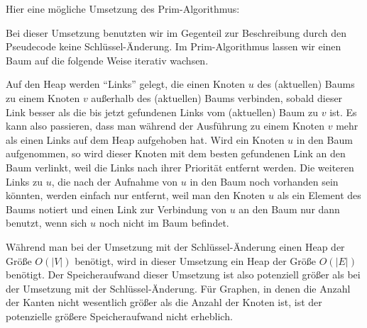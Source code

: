 \begin{bem} Hier eine mögliche Umsetzung des Prim-Algorithmus: 

Bei dieser Umsetzung benutzten wir im Gegenteil zur Beschreibung durch den Pseudecode keine Schlüssel-Änderung. Im Prim-Algorithmus lassen wir einen Baum auf die folgende Weise iterativ wachsen. 

Auf den Heap werden ``Links'' gelegt, die einen Knoten $u$ des (aktuellen) Baums zu einem Knoten $v$ außerhalb des (aktuellen) Baums verbinden, sobald dieser Link besser als die bis jetzt gefundenen Links vom (aktuellen) Baum zu $v$ ist. Es kann also passieren, dass man während der Ausführung zu einem Knoten $v$ mehr als einen Links auf dem Heap aufgehoben hat. Wird ein Knoten $u$ in den Baum aufgenommen, so wird dieser Knoten mit dem besten gefundenen Link an den Baum verlinkt, weil die Links nach ihrer Priorität entfernt werden. Die weiteren Links zu $u$, die nach der Aufnahme von $u$ in den Baum noch vorhanden sein könnten, werden einfach nur entfernt, weil man den Knoten $u$ als ein Element des Baums notiert und einen Link zur Verbindung von $u$ an den Baum nur dann benutzt, wenn sich $u$ noch nicht im Baum befindet.  

Während man bei der Umsetzung mit der Schlüssel-Änderung einen Heap der Größe $O(|V|)$ benötigt, wird in dieser Umsetzung ein Heap der Größe $O(|E|)$ benötigt. Der Speicheraufwand dieser Umsetzung ist also potenziell größer als bei der Umsetzung mit der Schlüssel-Änderung. Für Graphen, in denen die Anzahl der Kanten nicht wesentlich größer als die Anzahl der Knoten ist, ist der potenzielle größere Speicheraufwand nicht erheblich. 
\end{bem} 

